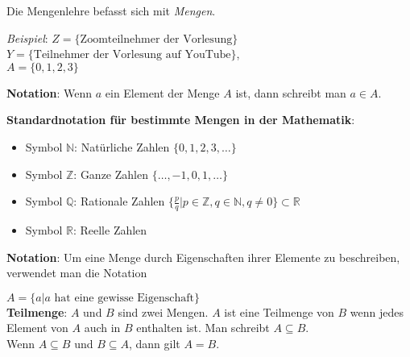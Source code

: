 \documentclass{article}
\begin{document}
Die Mengenlehre befasst sich mit \emph{Mengen}.



\emph{Beispiel}: $Z = \{ \text{Zoomteilnehmer der Vorlesung} \}$ \\
$Y = \{ \text{Teilnehmer der Vorlesung auf YouTube} \}$, \\
$A = \{ 0, 1, 2, 3 \}$

\textbf{Notation}: Wenn $a$ ein Element der Menge $A$ ist, dann schreibt man $a \in A$.

\textbf{Standardnotation für bestimmte Mengen in der Mathematik}:

\begin{itemize}
\item Symbol $\mathbb{N}$: Natürliche Zahlen $\{0, 1, 2, 3, \ldots \}$
\item Symbol $\mathbb{Z}$: Ganze Zahlen $\{ \ldots, -1, 0, 1, \ldots \}$
\item Symbol $\mathbb{Q}$: Rationale Zahlen $\{ \frac{p}{q} | p \in \mathbb{Z}, q \in \mathbb{N}, q \ne 0 \} \subset \mathbb{R}$ 
\item Symbol $\mathbb{R}$: Reelle Zahlen
\end{itemize}

\textbf{Notation}: Um eine Menge durch Eigenschaften ihrer Elemente zu beschreiben, verwendet man die Notation

$A = \{a | a \text{ hat eine gewisse Eigenschaft} \}$ \\

\textbf{Teilmenge}: $A$ und $B$ sind zwei Mengen. $A$ ist eine Teilmenge von $B$ wenn jedes Element von $A$ auch
in $B$ enthalten ist. Man schreibt $A \subseteq B$. \\

Wenn $A \subseteq B$ und $B \subseteq A$, dann gilt $A = B$. \\
\end{document}
